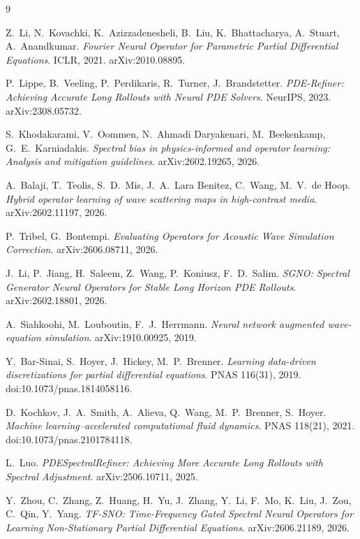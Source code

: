 \documentclass[11pt,a4paper]{article}
\begin{document}
\begin{thebibliography}{9}

Z.~Li, N.~Kovachki, K.~Azizzadenesheli, B.~Liu, K.~Bhattacharya, A.~Stuart, A.~Anandkumar.
\emph{Fourier Neural Operator for Parametric Partial Differential Equations}.
ICLR, 2021. arXiv:2010.08895.

P.~Lippe, B.~Veeling, P.~Perdikaris, R.~Turner, J.~Brandstetter.
\emph{PDE-Refiner: Achieving Accurate Long Rollouts with Neural PDE Solvers}.
NeurIPS, 2023. arXiv:2308.05732.

S.~Khodakarami, V.~Oommen, N.~Ahmadi Daryakenari, M.~Beekenkamp, G.~E.~Karniadakis.
\emph{Spectral bias in physics-informed and operator learning: Analysis and mitigation
guidelines}. arXiv:2602.19265, 2026.

A.~Balaji, T.~Teolis, S.~D.~Mis, J.~A.~Lara Benitez, C.~Wang, M.~V.~de Hoop.
\emph{Hybrid operator learning of wave scattering maps in high-contrast media}.
arXiv:2602.11197, 2026.

P.~Tribel, G.~Bontempi.
\emph{Evaluating Operators for Acoustic Wave Simulation Correction}.
arXiv:2606.08711, 2026.

J.~Li, P.~Jiang, H.~Saleem, Z.~Wang, P.~Koniusz, F.~D.~Salim.
\emph{SGNO: Spectral Generator Neural Operators for Stable Long Horizon PDE Rollouts}.
arXiv:2602.18801, 2026.

A.~Siahkoohi, M.~Louboutin, F.~J.~Herrmann.
\emph{Neural network augmented wave-equation simulation}.
arXiv:1910.00925, 2019.

Y.~Bar-Sinai, S.~Hoyer, J.~Hickey, M.~P.~Brenner.
\emph{Learning data-driven discretizations for partial differential equations}.
PNAS 116(31), 2019. doi:10.1073/pnas.1814058116.

D.~Kochkov, J.~A.~Smith, A.~Alieva, Q.~Wang, M.~P.~Brenner, S.~Hoyer.
\emph{Machine learning--accelerated computational fluid dynamics}.
PNAS 118(21), 2021. doi:10.1073/pnas.2101784118.

L.~Luo.
\emph{PDESpectralRefiner: Achieving More Accurate Long Rollouts with Spectral Adjustment}.
arXiv:2506.10711, 2025.

Y.~Zhou, C.~Zhang, Z.~Huang, H.~Yu, J.~Zhang, Y.~Li, F.~Mo, K.~Liu, J.~Zou, C.~Qin, Y.~Yang.
\emph{TF-SNO: Time-Frequency Gated Spectral Neural Operators for Learning Non-Stationary
Partial Differential Equations}. arXiv:2606.21189, 2026.

\end{thebibliography}
\end{document}
